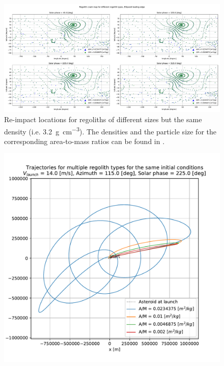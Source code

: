 \documentclass[print]{tudelft-report}
\begin{document}
\begin{appendices}
    \begin{figure}[htb]
    \centering
    \captionsetup{justification=centering}
    \includegraphics[angle=90, width=\textwidth, height=\textheight, keepaspectratio=true]{Results/Images/leading_edge_perturbations/crashMap_3P2_density_1cm_5cm_radius.pdf}
    \caption{Re-impact locations for regoliths of different sizes but the same density (i.e. \SI{3.2}{\gram\per\centi\metre\cubed}). The densities and the particle size for the corresponding area-to-mass ratios can be found in .}
    \label{fig:crashmap_3.2_density_1cm_5cm_Radius_leadingEdge}
    \end{figure}
    \FloatBarrier
    \begin{figure}[htb]
    \centering
    \captionsetup{justification=centering}
    \includegraphics[width=\textwidth, height=0.4\textheight, keepaspectratio=true]{Results/Images/leading_edge_perturbations/reimpact_traj_14ms_115Azim_225solarPhase.pdf}

\end{figure}
\end{appendices}
\end{document}
